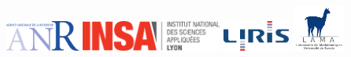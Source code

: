 \begin{titlepage}
\begin{addmargin}[-3.5cm]{-3cm}
\begin{center}
	{
	\includegraphics[height=1cm]{gfx/Logo_ANR}
	\includegraphics[height=1cm]{gfx/Logo_INSALyon}
	\includegraphics[height=1cm]{gfx/Logo_LIRIS}
	\includegraphics[height=1.5cm]{gfx/Logo_LAMA}
	}

    \end{center}
  \end{addmargin}
\end{titlepage}
